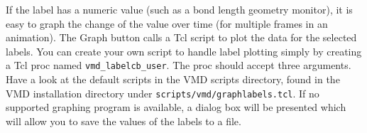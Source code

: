 If the label has a numeric value (such as a bond length geometry
monitor), it is easy to graph the change of the value over time (for
multiple frames in an animation).  The {\sf Graph} button calls a
Tcl script to plot the data for the selected labels.  You can create
your own script to handle label plotting simply by creating a Tcl proc
named {\tt vmd\_labelcb\_user}.  The proc should accept three arguments.
Have a look at the default scripts in the VMD scripts directory, found in
the VMD installation directory under {\tt scripts/vmd/graphlabels.tcl}.
If no supported graphing program is available, a dialog box will be
presented which will allow you to save the values of the labels to a file.
